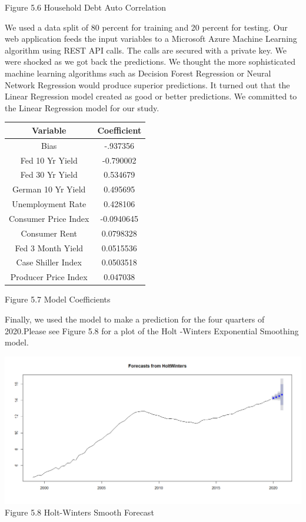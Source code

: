 \documentclass[sigconf,nonacm,11pt]{acmart}
\begin{document}
Figure 5.6 Household Debt Auto Correlation
\vspace{0.75em}

We used a data split of 80 percent for training and 20 percent for testing. Our web application feeds the input variables to a Microsoft Azure Machine Learning algorithm using REST API calls. The calls are secured with a private key.  We were shocked as we got back the predictions.  We thought the more sophisticated machine learning algorithms such as Decision Forest Regression or Neural Network Regression would produce  superior predictions. It turned out that the Linear Regression model created as good or better predictions.  We committed to the Linear Regression model for our study.

\vspace{0.5em}


\begin{center}
    \begin{tabular}{||c|c||}
    \hline
    Variable & Coefficient\\
    \hline\hline
    Bias & -.937356\\
    Fed 10 Yr Yield & -0.790002\\
    Fed 30 Yr Yield & 0.534679\\
    German 10 Yr Yield & 0.495695\\
    Unemployment Rate & 0.428106\\
    Consumer Price Index & -0.0940645\\
    Consumer Rent & 0.0798328\\
    Fed 3 Month Yield & 0.0515536\\
    Case Shiller Index & 0.0503518\\
    Producer Price Index & 0.047038\\
    \hline
    \end{tabular}
\end{center}

\vspace{0.5em}

Figure 5.7 Model Coefficients

\vspace{0.5em}


Finally, we used the model to make a prediction for the four quarters of 2020.Please see Figure 5.8 for a plot of the Holt -Winters Exponential Smoothing model.

\includegraphics[scale = 0.18]{ExpoSmoothForecast.png}
Figure 5.8 Holt-Winters Smooth Forecast
\end{document}
